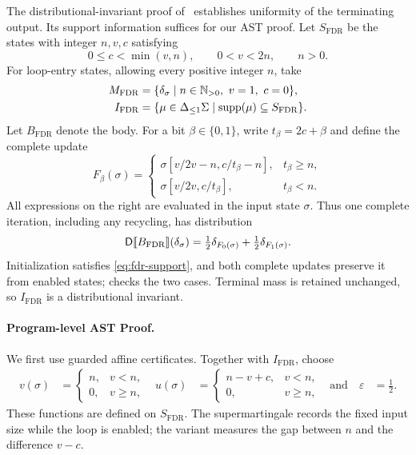 The distributional-invariant proof
of~\cite{zilken2026verifyingsamplingalgorithmsdistributional} establishes
uniformity of the terminating output. Its support information suffices
for our AST proof. Let $S_{\mathrm{FDR}}$ be the states with integer
$n,v,c$ satisfying
\begin{equation}
 0\leq c<\min(v,n),\qquad 0<v<2n,\qquad n>0.
 \label{eq:fdr-support}
\end{equation}
For loop-entry states, allowing every positive integer $n$, take
\[
 \begin{aligned}
 M_{\mathrm{FDR}}
 &=\{\delta_{\sigma}\mid n\in\mathbb N_{>0},\ v=1,\ c=0\},\\
 I_{\mathrm{FDR}}
 &=\{\mu\in{\Delta_{\leq 1}\Sigma}\mid\textnormal{supp}(\mu)\subseteq S_{\mathrm{FDR}}\}.
 \end{aligned}
\]
Let $B_{\mathrm{FDR}}$ denote the body. For a bit $\beta\in\{0,1\}$,
write $t_\beta=2c+\beta$ and define the complete update
\[
 F_\beta(\sigma)=
 \begin{cases}
   \sigma[v/2v-n,c/t_\beta-n],&t_\beta\geq n,\\
   \sigma[v/2v,c/t_\beta],&t_\beta<n.
 \end{cases}
\]
All expressions on the right are evaluated in the input state $\sigma$.
Thus one complete iteration, including any recycling, has distribution
\begin{equation}
 \mathsf{D}\llbracket B_{\mathrm{FDR}}\rrbracket(\delta_{\sigma})
 =\tfrac12\delta_{F_0(\sigma)}+\tfrac12\delta_{F_1(\sigma)}.
 \label{eq:fdr-post}
\end{equation}
Initialization satisfies \eqref{eq:fdr-support}, and both complete
updates preserve it from enabled states; 
checks the two cases. Terminal mass is retained unchanged, so
$I_{\mathrm{FDR}}$ is a distributional invariant.

\paragraph{Program-level AST Proof.}
We first use guarded affine certificates. Together with $I_{\mathrm{FDR}}$,
choose
\begin{equation}
\begin{aligned}
v(\sigma)&=\begin{cases}n,&v<n,\\0,&v\geq n,\end{cases}
&u(\sigma)&=\begin{cases}n-v+c,&v<n,\\0,&v\geq n,\end{cases}
&\text{and}\quad \varepsilon&=\tfrac12.
\end{aligned}
 \label{eq:fdr-affine-certificates}
\end{equation}
These functions are defined on $S_{\mathrm{FDR}}$. The supermartingale
records the fixed input size while the loop is enabled; the variant
measures the gap between $n$ and the difference $v-c$.

